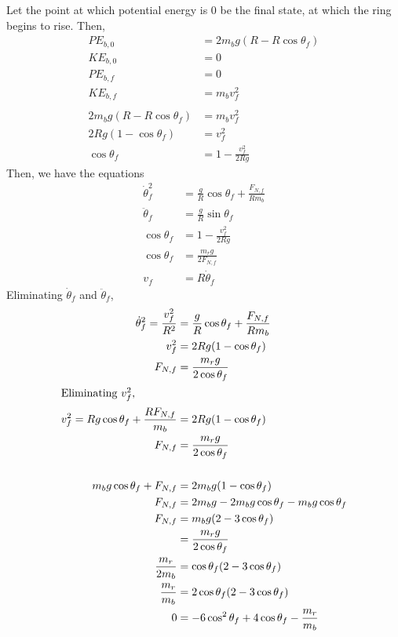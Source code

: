 \documentclass[solutions]{esg8012pset}
\begin{document}
\begin{enumerate}[a)]
   Let the point at which potential energy is 0 be the final state, at which the ring begins to rise.  Then,
   \begin{align*}
    PE_{b, 0} & = 2 m_b g(R - R\cos\theta_f) \\
    KE_{b, 0} & = 0 \\
    PE_{b, f} & = 0 \\
    KE_{b, f} & = m_b v_f^2 \\
    \\
    2 m_b g(R - R\cos\theta_f) & = m_b v_f^2 \\
    2 R g(1 - \cos\theta_f) & = v_f^2 \\
    \cos\theta_f & = 1 - \frac{v_f^2}{2 R g}
   \end{align*}
   Then, we have the equations \begin{align*}
    \dot\theta_f^2 & = \frac{g}{R}\cos\theta_f + \frac{F_{N,f}}{R m_b} \\
    \ddot\theta_f & = \frac{g}{R}\sin\theta_f \\
    \cos\theta_f & = 1 - \frac{v_f^2}{2 R g} \\
    \cos\theta_f & = \frac{m_r g}{2F_{N,f}} \\
    v_f & = R \dot\theta_f
   \end{align*}
   Eliminating $\dot\theta_f$ and $\ddot\theta_f$,
   \begin{align*}
    \dot\theta_f^2 = \frac{v_f^2}{R^2} & = \frac{g}{R}\cos\theta_f + \frac{F_{N,f}}{R m_b} \\
    v_f^2 & = 2 R g(1 - \cos\theta_f) \\
    F_{N,f} & = \frac{m_r g}{2\cos\theta_f} \\
\intertext{Eliminating $v_f^2$,}
    v_f^2 = Rg\cos\theta_f + \frac{R F_{N,f}}{m_b} & = 2 R g(1 - \cos\theta_f) \\
    F_{N,f} & = \frac{m_r g}{2\cos\theta_f} \\
    \\
    m_b g\cos\theta_f + F_{N,f} & = 2 m_b g(1 - \cos\theta_f) \\
    F_{N,f} & = 2 m_b g - 2 m_b g \cos\theta_f - m_b g\cos\theta_f \\
    F_{N,f} & = m_b g(2 - 3\cos\theta_f) \\
     & = \frac{m_r g}{2\cos\theta_f} \\
    \frac{m_r}{2m_b} & = \cos\theta_f(2-3\cos\theta_f) \\
    \frac{m_r}{m_b} & = 2\cos\theta_f(2 - 3\cos\theta_f) \\
    0 & = -6\cos^2\theta_f + 4\cos\theta_f - \frac{m_r}{m_b} \\

\end{align*}
\end{enumerate}
\end{document}
